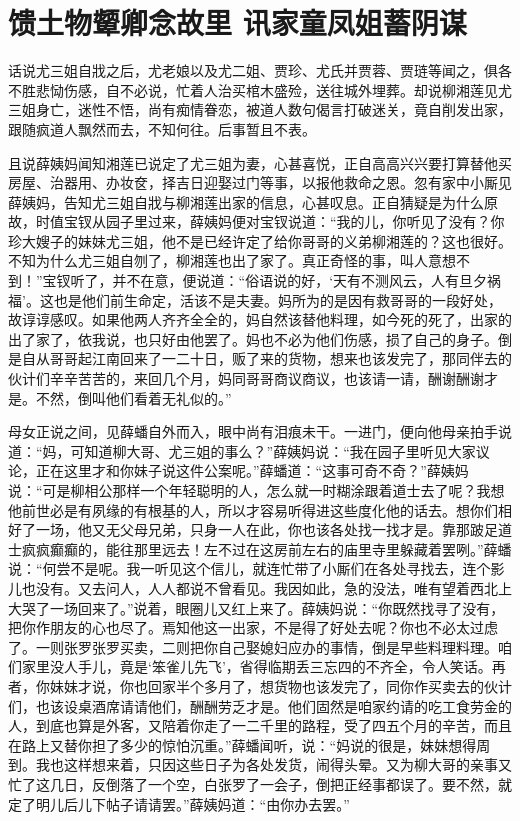 
\chapter{馈土物颦卿念故里 讯家童凤姐蓄阴谋}
话说尤三姐自戕之后，尤老娘以及尤二姐、贾珍、尤氏并贾蓉、贾琏等闻之，俱各不胜悲恸伤感，自不必说，忙着人治买棺木盛殓，送往城外埋葬。却说柳湘莲见尤三姐身亡，迷性不悟，尚有痴情眷恋，被道人数句偈言打破迷关，竟自削发出家，跟随疯道人飘然而去，不知何往。后事暂且不表。

且说薛姨妈闻知湘莲已说定了尤三姐为妻，心甚喜悦，正自高高兴兴要打算替他买房屋、治器用、办妆奁，择吉日迎娶过门等事，以报他救命之恩。忽有家中小厮见薛姨妈，告知尤三姐自戕与柳湘莲出家的信息，心甚叹息。正自猜疑是为什么原故，时值宝钗从园子里过来，薛姨妈便对宝钗说道：``我的儿，你听见了没有？你珍大嫂子的妹妹尤三姐，他不是已经许定了给你哥哥的义弟柳湘莲的？这也很好。不知为什么尤三姐自刎了，柳湘莲也出了家了。真正奇怪的事，叫人意想不到！''宝钗听了，并不在意，便说道：``俗语说的好，`天有不测风云，人有旦夕祸福'。这也是他们前生命定，活该不是夫妻。妈所为的是因有救哥哥的一段好处，故谆谆感叹。如果他两人齐齐全全的，妈自然该替他料理，如今死的死了，出家的出了家了，依我说，也只好由他罢了。妈也不必为他们伤感，损了自己的身子。倒是自从哥哥起江南回来了一二十日，贩了来的货物，想来也该发完了，那同伴去的伙计们辛辛苦苦的，来回几个月，妈同哥哥商议商议，也该请一请，酬谢酬谢才是。不然，倒叫他们看着无礼似的。''

母女正说之间，见薛蟠自外而入，眼中尚有泪痕未干。一进门，便向他母亲拍手说道：``妈，可知道柳大哥、尤三姐的事么？''薛姨妈说：``我在园子里听见大家议论，正在这里才和你妹子说这件公案呢。''薛蟠道：``这事可奇不奇？''薛姨妈说：``可是柳相公那样一个年轻聪明的人，怎么就一时糊涂跟着道士去了呢？我想他前世必是有夙缘的有根基的人，所以才容易听得进这些度化他的话去。想你们相好了一场，他又无父母兄弟，只身一人在此，你也该各处找一找才是。靠那跛足道士疯疯癫癫的，能往那里远去！左不过在这房前左右的庙里寺里躲藏着罢咧。''薛蟠说：``何尝不是呢。我一听见这个信儿，就连忙带了小厮们在各处寻找去，连个影儿也没有。又去问人，人人都说不曾看见。我因如此，急的没法，唯有望着西北上大哭了一场回来了。''说着，眼圈儿又红上来了。薛姨妈说：``你既然找寻了没有，把你作朋友的心也尽了。焉知他这一出家，不是得了好处去呢？你也不必太过虑了。一则张罗张罗买卖，二则把你自己娶媳妇应办的事情，倒是早些料理料理。咱们家里没人手儿，竟是`笨雀儿先飞'，省得临期丢三忘四的不齐全，令人笑话。再者，你妹妹才说，你也回家半个多月了，想货物也该发完了，同你作买卖去的伙计们，也该设桌酒席请请他们，酬酬劳乏才是。他们固然是咱家约请的吃工食劳金的人，到底也算是外客，又陪着你走了一二千里的路程，受了四五个月的辛苦，而且在路上又替你担了多少的惊怕沉重。''薛蟠闻听，说：``妈说的很是，妹妹想得周到。我也这样想来着，只因这些日子为各处发货，闹得头晕。又为柳大哥的亲事又忙了这几日，反倒落了一个空，白张罗了一会子，倒把正经事都误了。要不然，就定了明儿后儿下帖子请请罢。''薛姨妈道：``由你办去罢。''


